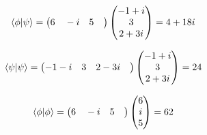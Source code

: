 \documentclass[10pt,a4paper]{article}
\begin{document}
\begin{align}
\braket{\phi|\psi}= \begin{pmatrix}
6\quad-i\quad5\quad\end{pmatrix}\begin{pmatrix}
-1+ i\\
3\\
2+3i\\
\end{pmatrix}=4+18i &\end{align}

\begin{align}
\braket{\psi|\psi}= \begin{pmatrix}
-1-i\quad3\quad2-3i\quad\end{pmatrix}\begin{pmatrix}
-1+ i\\
3\\
2+3i\\
\end{pmatrix}=24 &\end{align}

\begin{align}
\braket{\phi|\phi}= \begin{pmatrix}
6\quad-i\quad5\quad\end{pmatrix}\begin{pmatrix}
6\\
 i\\
5\\
\end{pmatrix}=62 &\end{align}
\end{document}
